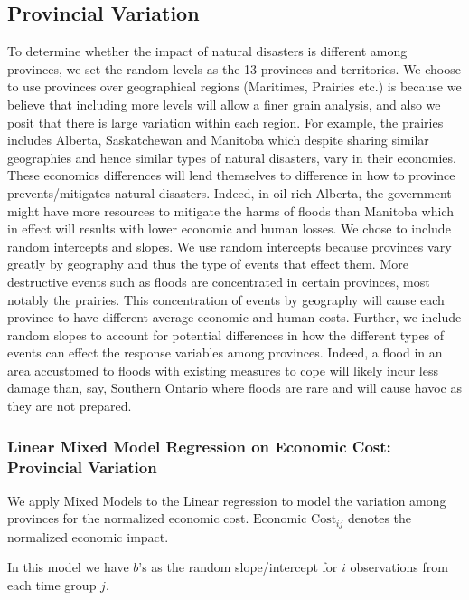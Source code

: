 \subsection{Provincial Variation}
To determine whether the impact of natural disasters is different among provinces, we set the random levels as the 13 provinces and territories. We choose to use provinces over geographical regions (Maritimes, Prairies etc.) is because we believe that including more levels will allow a finer grain analysis, and also we posit that there is large variation within each region. For example, the prairies includes Alberta, Saskatchewan and Manitoba which despite sharing similar geographies and hence similar types of natural disasters, vary in their economies. These economics differences will lend themselves to difference in how to province prevents/mitigates natural disasters. Indeed, in oil rich Alberta, the government might have more resources to mitigate the harms of floods than Manitoba which in effect will results with lower economic and human losses.  
We chose to include random intercepts and slopes.
We use random intercepts because provinces vary greatly by geography and thus the type of events that effect them. More destructive events such as floods are concentrated in certain provinces, most notably the prairies. This concentration of events by geography will cause each province to have different average economic and human costs.
Further, we include random slopes to account for potential differences in how the different types of events can effect the response variables among provinces. Indeed, a flood in an area accustomed to floods with existing measures to cope will likely incur less damage than, say, Southern Ontario where floods are rare and will cause havoc as they are not prepared.

\subsubsection{Linear Mixed Model Regression on Economic Cost: Provincial Variation}
We apply Mixed Models to the Linear regression to model the variation among provinces for the normalized economic cost. $\text{Economic Cost}_{ij}$ denotes the normalized economic impact.

In this model we have $b$'s as the random slope/intercept for $i$ observations from each time group $j$.

